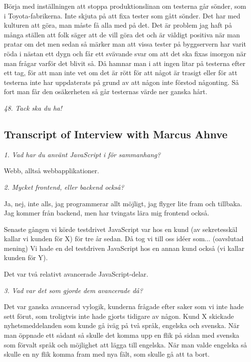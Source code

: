\documentclass[11pt]{article}
\begin{document}
Börja med inställningen att stoppa produktionslinan om testerna går sönder, som i Toyota-fabrikerna. Inte skjuta på att fixa tester som gått sönder. Det har med kulturen att göra, man måste få alla med på det. Det är problem jag haft på många ställen att folk säger att de vill göra det och är väldigt positiva när man pratar om det men sedan så märker man att vissa tester på byggservern har varit röda i nästan ett dygn och får ett svävande svar om att det ska fixas imorgon när man frågar varför det blivit så. Då hamnar man i att ingen litar på testerna efter ett tag, för att man inte vet om det är rött för att något är trasigt eller för att testerna inte har uppdaterats på grund av att någon inte förstod någonting. Så fort man får den osäkerheten så går testernas värde ner ganska hårt.

\emph{48. Tack ska du ha!}

\subsection*{Transcript of Interview with Marcus Ahnve}

\emph{1. Vad har du använt JavaScript i för sammanhang?}

Webb, alltså webbapplikationer.

\emph{2. Mycket frontend, eller backend också?}

Ja, nej, inte alls, jag programmerar allt möjligt, jag flyger lite fram och tillbaka. Jag kommer från backend, men har tvingats lära mig frontend också.

Senaste gången vi körde testdrivet JavaScript var hos en kund (av sekretesskäl kallar vi kunden för X) för tre år sedan. Då tog vi till oss idéer som... (oavslutad mening) Vi hade en del testdriven JavaScript hos en annan kund också (vi kallar kunden för Y).

Det var två relativt avancerade JavaScript-delar.

\emph{3. Vad var det som gjorde dem avancerade då?}

Det var ganska avancerad vylogik, kunderna frågade efter saker som vi inte hade sett förut, som troligtvis inte hade gjorts tidigare av någon. Kund X skickade nyhetsmeddelanden som kunde gå iväg på två språk, engelska och svenska. När man öppnade ett sådant så skulle det komma upp en flik på sidan med svenska som förvalt språk och möjlighet att lägga till engelska. När man valde engelska så skulle en ny flik komma fram med nya fält, som skulle gå att ta bort.
\end{document}
